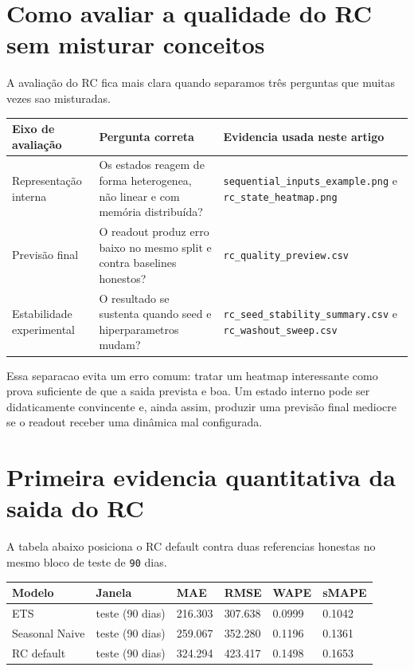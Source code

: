 \documentclass[12pt]{article}
\begin{document}
\section{Como avaliar a qualidade do RC sem misturar conceitos}\label{9-como-avaliar-a-qualidade-do-rc-sem-misturar-conceitos}

A avaliação do RC fica mais clara quando separamos três perguntas que muitas vezes sao misturadas.

\begin{longtable}[]{@{}lll@{}}
\toprule\noalign{}
Eixo de avaliação & Pergunta correta & Evidencia usada neste artigo \\
\midrule\noalign{}
\endhead
\bottomrule\noalign{}
\endlastfoot
Representação interna & Os estados reagem de forma heterogenea, não linear e com memória distribuída? & \texttt{sequential\_inputs\_example.png} e \texttt{rc\_state\_heatmap.png} \\
Previsão final & O readout produz erro baixo no mesmo split e contra baselines honestos? & \texttt{rc\_quality\_preview.csv} \\
Estabilidade experimental & O resultado se sustenta quando seed e hiperparametros mudam? & \texttt{rc\_seed\_stability\_summary.csv} e \texttt{rc\_washout\_sweep.csv} \\
\end{longtable}

Essa separacao evita um erro comum: tratar um heatmap interessante como prova suficiente de que a saida prevista e boa. Um estado interno pode ser didaticamente convincente e, ainda assim, produzir uma previsão final mediocre se o readout receber uma dinâmica mal configurada.

\section{Primeira evidencia quantitativa da saida do RC}\label{10-primeira-evidencia-quantitativa-da-saida-do-rc}

A tabela abaixo posiciona o RC default contra duas referencias honestas no mesmo bloco de teste de \texttt{90} dias.

\begin{longtable}[]{@{}llllll@{}}
\toprule\noalign{}
Modelo & Janela & MAE & RMSE & WAPE & sMAPE \\
\midrule\noalign{}
\endhead
\bottomrule\noalign{}
\endlastfoot
ETS & teste (90 dias) & 216.303 & 307.638 & 0.0999 & 0.1042 \\
Seasonal Naive & teste (90 dias) & 259.067 & 352.280 & 0.1196 & 0.1361 \\
RC default & teste (90 dias) & 324.294 & 423.417 & 0.1498 & 0.1653 \\
\end{longtable}
\end{document}
